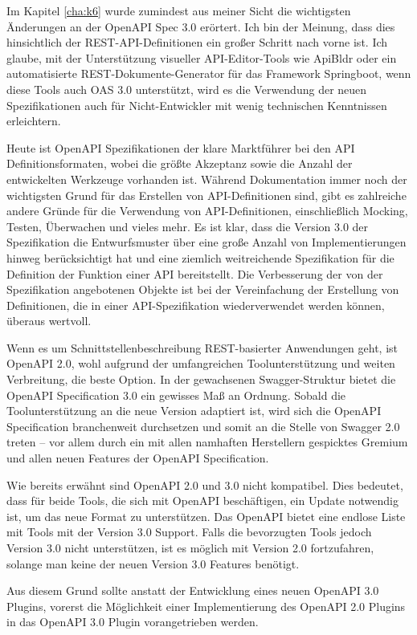 
Im Kapitel \ref{cha:k6} wurde zumindest aus meiner Sicht die wichtigsten Änderungen an der OpenAPI Spec 3.0 erörtert. Ich bin der Meinung, dass dies hinsichtlich der REST-API-Definitionen ein großer Schritt nach vorne ist. Ich glaube, mit der Unterstützung visueller API-Editor-Tools wie ApiBldr oder ein automatisierte REST-Dokumente-Generator für das Framework Springboot, wenn diese Tools auch OAS 3.0 unterstützt, wird es die Verwendung der neuen Spezifikationen auch für Nicht-Entwickler mit wenig technischen Kenntnissen erleichtern.

Heute ist OpenAPI Spezifikationen der klare Marktführer bei den API Definitionsformaten, wobei die größte Akzeptanz sowie die Anzahl der entwickelten Werkzeuge vorhanden ist. Während Dokumentation immer noch der wichtigsten Grund für das Erstellen von API-Definitionen sind, gibt es zahlreiche andere Gründe für die Verwendung von API-Definitionen, einschließlich Mocking, Testen, Überwachen und vieles mehr. Es ist klar, dass die Version 3.0 der Spezifikation die Entwurfsmuster über eine große Anzahl von Implementierungen hinweg berücksichtigt hat und eine ziemlich weitreichende Spezifikation für die Definition der Funktion einer API bereitstellt. Die Verbesserung der von der Spezifikation angebotenen Objekte ist bei der Vereinfachung der Erstellung von Definitionen, die in einer API-Spezifikation wiederverwendet werden können, überaus wertvoll.

Wenn es um Schnittstellenbeschreibung REST-basierter Anwendungen geht, ist OpenAPI 2.0, wohl aufgrund der umfangreichen Toolunterstützung und weiten Verbreitung, die beste Option. In der gewachsenen Swagger-Struktur bietet die OpenAPI Specification 3.0 ein gewisses Maß an Ordnung. Sobald die Toolunterstützung an die neue Version adaptiert ist, wird sich die OpenAPI Specification branchenweit durchsetzen und somit an die Stelle von Swagger 2.0 treten – vor allem durch ein mit allen namhaften Herstellern gespicktes Gremium und allen neuen Features der OpenAPI Specification.

Wie bereits erwähnt sind OpenAPI 2.0 und 3.0 nicht kompatibel. Dies bedeutet, dass für beide Tools, die sich mit OpenAPI beschäftigen, ein Update notwendig ist, um das neue Format zu unterstützen. Das OpenAPI bietet eine endlose Liste mit Tools mit der Version 3.0 Support. Falls die bevorzugten Tools jedoch Version 3.0 nicht unterstützen, ist es möglich mit Version 2.0 fortzufahren, solange man keine der neuen Version 3.0 Features benötigt.

Aus diesem Grund sollte anstatt der Entwicklung eines neuen OpenAPI 3.0 Plugins, vorerst die Möglichkeit einer Implementierung des OpenAPI 2.0 Plugins in das OpenAPI 3.0 Plugin vorangetrieben werden.






